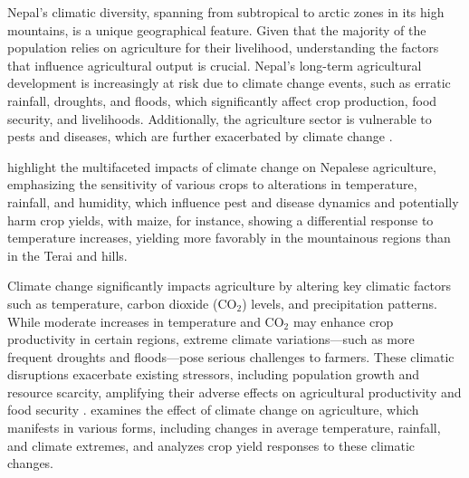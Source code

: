 Nepal’s climatic diversity, spanning from subtropical to arctic zones in its high mountains, is a unique geographical feature. Given that the majority of the population relies on agriculture for their livelihood, understanding the factors that influence agricultural output is crucial. Nepal's long-term agricultural development is increasingly at risk due to climate change events, such as erratic rainfall, droughts, and floods, which significantly affect crop production, food security, and livelihoods. Additionally, the agriculture sector is vulnerable to pests and diseases, which are further exacerbated by climate change \parencite{gyawaliOverviewAgricultureNepal2021}.

\parencite{mallaClimateChangeIts2009} highlight the multifaceted impacts of climate change on Nepalese agriculture, emphasizing the sensitivity of various crops to alterations in temperature, rainfall, and humidity, which influence pest and disease dynamics and potentially harm crop yields, with maize, for instance, showing a differential response to temperature increases, yielding more favorably in the mountainous regions than in the Terai and hills.
 
Climate change significantly impacts agriculture by altering key climatic factors such as temperature, carbon dioxide (CO$_2$) levels, and precipitation patterns. While moderate increases in temperature and CO$_2$ may enhance crop productivity in certain regions, extreme climate variations—such as more frequent droughts and floods—pose serious challenges to farmers. These climatic disruptions exacerbate existing stressors, including population growth and resource scarcity, amplifying their adverse effects on agricultural productivity and food security \parencite{global_paudel_2015}. \parencite{regmiCROPYIELDRESPONSE2019} examines the effect of climate change on agriculture, which manifests in various forms, including changes in average temperature, rainfall, and climate extremes, and analyzes crop yield responses to these climatic changes.

